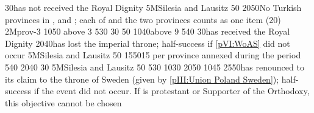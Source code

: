 %
%
{}{30}{\paysmajeurPrusse has not received the Royal Dignity}%
%
\EUobjective5M{Silesia and Lausitz}{}%
{}{50}{\EU@objSilesie}%
%
%
%
{20}{50}{No Turkish provinces in \payshongrie, \provinceBosna and
  \provinceSerbia; each of \payshongrie and the two provinces counts as one
  item (20\VPs)}%
%
\EUobjective2M{\paysnaples}{prov-3}%
{10}{50}{\EU@objEachProvinceOther{\paysNaples} above 3}%
%
%
{5}{30}{\EU@objAlliance}%
%
%
{}{30}{\EU@objFranceContained}%
%
%
{}{50}{\EU@objSilesie}%
%
 
%
%
{10}{40}{\EU@objEachProvince above 9}%
%
%
{5}{40}{\EU@objAlliance}%
%
%
{}{30}{\paysmajeurPrusse has received the Royal Dignity}%
%
%
{20}{40}{\paysmajeurAutriche has lost the imperial throne; half-success if
  \ref{pVI:WoAS} did not occur}%
%
\EUobjective5M{Silesia and Lausitz}{}%
{}{50}{\EU@objSilesie}%
%
%
%
{15}{50}{15 \VPs per province annexed during the period}%
%
%
{5}{40}{\EU@objAlliance}%
%
%
{20}{40}{\EU@objSYW}
%
%
{}{30}{\EU@objFranceContained}%
%
\EUobjective5M{Silesia and Lausitz}{}%
{}{50}{\EU@objSilesie}%
%
 
%
%
{5}{30}{\EU@objBaltiqueTrade}%
%
%
%
{10}{30}{}%
%
%
{20}{50}{}%
%
%
{10}{45}{}%
%
%
{25}{50}{\paysmajeurPologne has renounced to its claim to the throne of Sweden
  (given by \ref{pIII:Union Poland Sweden}); half-success if the event did not
  occur. If \paysmajeurPologne is protestant or Supporter of the Orthodoxy,
  this objective cannot be chosen}%
